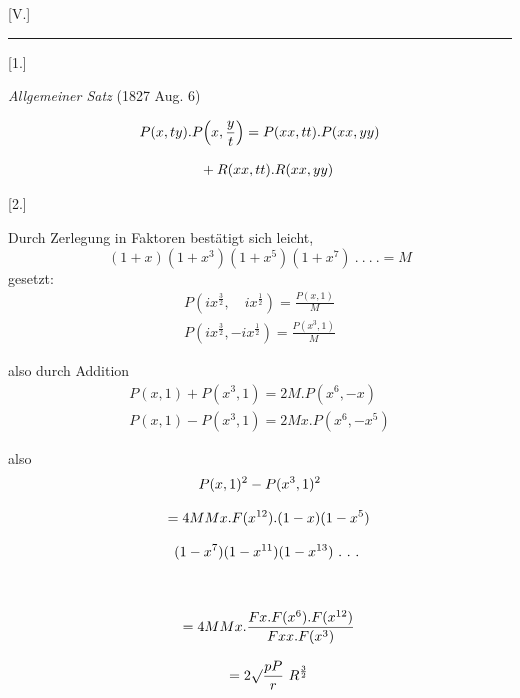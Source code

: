 \begingroup
\renewcommand{\arraystretch}{1.45}
\clearpage{}


\begin{center}[V.]\par\rule{.10\linewidth}{.3pt}\end{center}


\begin{center}[1.]\par\emph{Allgemeiner Satz} (1827 Aug. 6)\end{center}
\[
\begin{gathered}P(x,ty).P\Bigl(x,\frac yt\Bigr)=P(xx,tt).P(xx,yy)\\[8pt]\quad{}+R(xx,tt).R(xx,yy)\end{gathered}
\]

\par\medskip{}\centerline{[2.]}\nobreak\smallskip
Durch Zerlegung in Faktoren bestätigt sich leicht,
\[
(1+x)(1+x^3)(1+x^5)(1+x^7)\ .\ .\ .\ .=M
\]
gesetzt:
\[
\begin{gathered}
P(ix^{\frac32},\quad ix^{\frac12})=\frac{P(x,1)}{M}\\[8pt]
P(ix^{\frac32},-ix^{\frac12})=\frac{P(x^3,1)}{M}
\end{gathered}
\]

also durch Addition
\[
\begin{gathered}
P(x,1)+P(x^3,1)=2M.P(x^6,-x)\\[8pt]
P(x,1)-P(x^3,1)=2Mx.P(x^6,-x^5)
\end{gathered}
\]

also
\[
\begin{gathered}
P(x,1)^2-P(x^3,1)^2
\\[8pt]\quad{}=4MMx.F(x^{12}).(1-x)(1-x^5)\\[8pt]\quad{}(1-x^7)(1-x^{11})(1-x^{13})\ .\ .\ .\\[8pt]
\\[8pt]\quad{}=4MMx.\frac{Fx.F(x^6).F(x^{12})}{Fxx.F(x^3)}
\\[8pt]\quad{}=2\surd\frac{pP}{r}\ R^{\frac32}
\end{gathered}
\]





